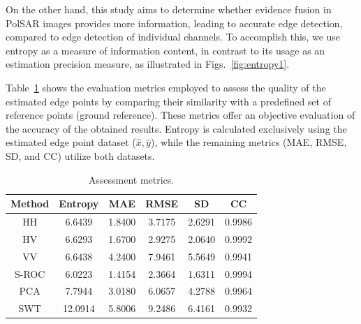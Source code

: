 \documentclass{article}
\begin{document}
On the other hand, this study aims to determine whether evidence fusion in PolSAR images provides more information, leading to accurate edge detection, compared to edge detection of individual channels. To accomplish this, we use entropy as a measure of information content, in contrast to its usage as an estimation precision measure, as illustrated in Figs.~\ref{fig:entropy1}.

Table~\ref{tab_1} shows the evaluation metrics employed to assess the quality of the estimated edge points by comparing their similarity with a predefined set of reference points (ground reference). These metrics offer an objective evaluation of the accuracy of the obtained results. Entropy is calculated exclusively using the estimated edge point dataset ($\hat{x},\hat{y}$), while the remaining metrics (MAE, RMSE, SD, and CC) utilize both datasets. 
\begin{table}[hbt]
  \centering
  \begin{tabular}{@{}cccccc@{}}
    \toprule
Method  &Entropy    & MAE        & RMSE       &SD       & CC \\
    \midrule
   HH  & 6.6439      & 1.8400       & 3.7175   & 2.6291   & 0.9986 \\
   HV  & 6.6293      & 1.6700       & 2.9275   & 2.0640   & 0.9992 \\
   VV  & 6.6438      & 4.2400      & 7.9461    & 5.5649   & 0.9941 \\
   S-ROC & 6.0223      & 1.4154      & 2.3664    & 1.6311    & 0.9994 \\
   PCA & 7.7944      & 3.0180       & 6.0657   & 4.2788  & 0.9964 \\
   SWT & 12.0914     & 5.8006      & 9.2486   & 6.4161  & 0.9932 \\
    \bottomrule
  \end{tabular}\vspace{-0.1cm}
  \caption{Assessment metrics.}
  \label{tab_1}
  \end{table}
\end{document}
